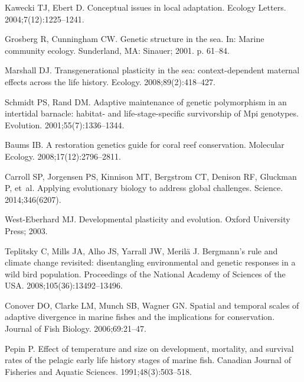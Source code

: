 \documentclass[10pt,letterpaper]{article}
\begin{document}
\nolinenumbers
\begin{thebibliography}{10}

Kawecki TJ, Ebert D.
\newblock Conceptual issues in local adaptation.
\newblock Ecology Letters. 2004;7(12):1225--1241.

Grosberg R, Cunningham CW.
\newblock Genetic structure in the sea.
\newblock In: Marine community ecology. Sunderland, MA: Sinauer; 2001. p.
  61--84.

Marshall DJ.
\newblock Transgenerational plasticity in the sea: context-dependent maternal
  effects across the life history.
\newblock Ecology. 2008;89(2):418--427.

Schmidt PS, Rand DM.
\newblock Adaptive maintenance of genetic polymorphism in an intertidal
  barnacle: habitat- and life-stage-specific survivorship of Mpi genotypes.
\newblock Evolution. 2001;55(7):1336--1344.

Baums IB.
\newblock A restoration genetics guide for coral reef conservation.
\newblock Molecular Ecology. 2008;17(12):2796--2811.

Carroll SP, Jorgensen PS, Kinnison MT, Bergstrom CT, Denison RF, Gluckman P,
  et~al.
\newblock Applying evolutionary biology to address global challenges.
\newblock Science. 2014;346(6207).

West-Eberhard MJ.
\newblock Developmental plasticity and evolution.
\newblock Oxford University Press; 2003.

Teplitsky C, Mills JA, Alho JS, Yarrall JW, Meril{\"a} J.
\newblock Bergmann's rule and climate change revisited: disentangling
  environmental and genetic responses in a wild bird population.
\newblock Proceedings of the National Academy of Sciences of the USA. 2008;105(36):13492--13496.

Conover DO, Clarke LM, Munch SB, Wagner GN.
\newblock Spatial and temporal scales of adaptive divergence in marine fishes
  and the implications for conservation.
\newblock Journal of Fish Biology. 2006;69:21--47.

Pepin P.
\newblock Effect of temperature and size on development, mortality, and
  survival rates of the pelagic early life history stages of marine fish.
\newblock Canadian Journal of Fisheries and Aquatic Sciences. 1991;48(3):503--518.


\end{thebibliography}
\end{document}
